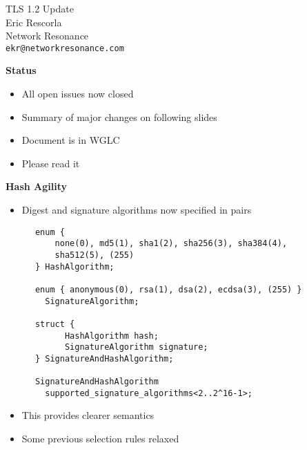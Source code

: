 \documentclass[helvetica]{seminar}
\newcommand{\heading}[1]{%
  \begin{center} 
    \large\bf 
    #1 
  \end{center} 
  \vspace{.4 in}}
\begin{document}
        
\begin{slide}
\begin{center}
\LARGE{{\bf}TLS 1.2 Update}\\

\vspace{.3 in}
\large{Eric Rescorla}\\
\large{Network Resonance}\\
\large{\texttt{ekr@networkresonance.com}}

\end{center}
\end{slide}


\begin{slide}
\heading{Status}

\begin{itemize}
\item All open issues now closed
\item Summary of major changes on following slides
\item Document is in WGLC
\item Please read it
\end{itemize}

\end{slide}


\begin{slide}
\heading{Hash Agility}

\begin{itemize}
\item Digest and signature algorithms now specified in
      pairs
\end{itemize}


{\tiny
\begin{verbatim}
      enum {
          none(0), md5(1), sha1(2), sha256(3), sha384(4),
          sha512(5), (255)
      } HashAlgorithm;

      enum { anonymous(0), rsa(1), dsa(2), ecdsa(3), (255) }
        SignatureAlgorithm;

      struct {
            HashAlgorithm hash;
            SignatureAlgorithm signature;
      } SignatureAndHashAlgorithm;

      SignatureAndHashAlgorithm
        supported_signature_algorithms<2..2^16-1>;
\end{verbatim}
}

\begin{itemize}
\item This provides clearer semantics
\item Some previous selection rules relaxed
\end{itemize}
\end{slide}
\end{document}
